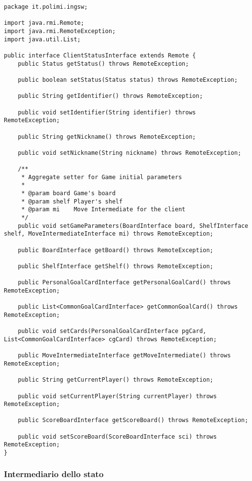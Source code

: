 \documentclass[a4paper,11pt]{article} %
\begin{document}
    \begin{verbatim}
package it.polimi.ingsw;

import java.rmi.Remote;
import java.rmi.RemoteException;
import java.util.List;

public interface ClientStatusInterface extends Remote {
    public Status getStatus() throws RemoteException;

    public boolean setStatus(Status status) throws RemoteException;

    public String getIdentifier() throws RemoteException;

    public void setIdentifier(String identifier) throws RemoteException;

    public String getNickname() throws RemoteException;

    public void setNickname(String nickname) throws RemoteException;

    /**
     * Aggregate setter for Game initial parameters
     *
     * @param board Game's board
     * @param shelf Player's shelf
     * @param mi    Move Intermediate for the client
     */
    public void setGameParameters(BoardInterface board, ShelfInterface shelf, MoveIntermediateInterface mi) throws RemoteException;

    public BoardInterface getBoard() throws RemoteException;

    public ShelfInterface getShelf() throws RemoteException;

    public PersonalGoalCardInterface getPersonalGoalCard() throws RemoteException;

    public List<CommonGoalCardInterface> getCommonGoalCard() throws RemoteException;

    public void setCards(PersonalGoalCardInterface pgCard, List<CommonGoalCardInterface> cgCard) throws RemoteException;

    public MoveIntermediateInterface getMoveIntermediate() throws RemoteException;

    public String getCurrentPlayer() throws RemoteException;

    public void setCurrentPlayer(String currentPlayer) throws RemoteException;

    public ScoreBoardInterface getScoreBoard() throws RemoteException;

    public void setScoreBoard(ScoreBoardInterface sci) throws RemoteException;
}
    \end{verbatim}

    \subsubsection{Intermediario dello stato}
\end{document}
